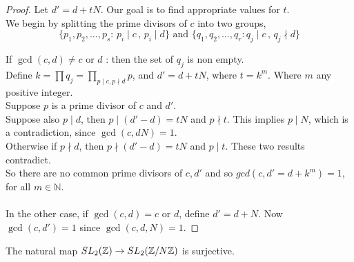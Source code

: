 \begin{proof}
Let $d' = d+ tN$. Our goal is to find appropriate values for $t$.
\\ 
We begin by splitting the prime divisors of $c$ into two groups, 
\\ 
$$\{p_1,p_2,\dots,p_s \colon \, p_i \mid c \,,\, p_i \mid d\} \text{ and } \{q_1,q_2,\dots, q_r \colon q_j \mid c\, ,\, q_j \nmid d\}$$

If $\gcd(c,d) \neq c \text{ or } d$ : then the set of $q_j$ is non empty.\\
Define $k = \prod{q_j} = \prod_{p\mid c,p\nmid d}p$, and $d' = d + tN$, where $t = k^m$. Where $m$ any positive integer.\\
Suppose $p$ is a prime divisor of $c$ and $d'$. \\
Suppose also $p \mid d$, then $p \mid (d' -d)  = tN$ and $p \nmid t$. This implies $p \mid N$, which is a contradiction, since $\gcd(c,dN) =1$. \\
Otherwise if $p \nmid d$, then $p \nmid (d' -d) = tN$ and $p \mid t$. These two results contradict.  \\
So there are no common prime divisors of $c,d'$ and so $gcd(c,d' = d + k^m) = 1$, for all $m \in \mathbb{N}$.\\
\\
In the other case, if $\gcd(c,d) = c \text{ or } d$, define $d' = d+ N$. Now $\gcd(c,d') =1$ since $\gcd(c,d,N) =1$.
\end{proof}

\begin{theorem}\label{thm:surjective}
The natural map $SL_2(\mathbb{Z}) \rightarrow SL_2(\mathbb{Z}/N\mathbb{Z})$ is surjective.
\end{theorem}

